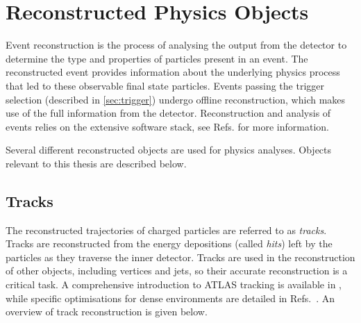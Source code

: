 









\section{Reconstructed Physics Objects}\label{sec:physics-objects}

Event reconstruction is the process of analysing the output from the detector to determine the type and properties of particles present in an event. 
The reconstructed event provides information about the underlying physics process that led to these observable final state particles.
Events passing the trigger selection (described in \cref{sec:trigger}) undergo offline reconstruction, which makes use of the full information from the detector.
Reconstruction and analysis of events relies on the extensive \ATLAS software stack, see Refs. \cite{ATL-SOFT-PUB-2021-001,ATL-SOFT-PUB-2020-001} for more information.

Several different reconstructed objects are used for physics analyses.
Objects relevant to this thesis are described below.



\subsection{Tracks}\label{sec:track_reco}
The reconstructed trajectories of charged particles are referred to as \textit{tracks}.
Tracks are reconstructed from the energy depositions (called \textit{hits}) left by the particles as they traverse the inner detector.
Tracks are used in the reconstruction of other objects, including vertices and jets, so their accurate reconstruction is a critical task.
A comprehensive introduction to ATLAS tracking is available in , while specific optimisations for dense environments are detailed in Refs.~\cite{ATL-PHYS-PUB-2015-006, PERF-2015-08}.
An overview of track reconstruction is given below.

